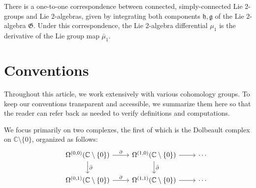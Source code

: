 \documentclass[11pt]{amsart}
\newcommand{\C}{{\mathbb C}}
\newcommand{\fg}{\mathfrak{g}}
\newcommand{\fh}{\mathfrak{h}}
\newcommand{\fG}{\mathfrak{G}}
\numberwithin{equation}{section}
\numberwithin{figure}{section}
\numberwithin{table}{section}
\theoremstyle{thm}
\numberwithin{equation}{subsection}
\theoremstyle{definition}
\theoremstyle{rem}
\begin{document}
There is a one-to-one correspondence between connected, simply-connected Lie 2-groups and Lie 2-algebras, given by integrating both components $\fh,\fg$ of the Lie 2-algebra $\fG$. Under this correspondence, the Lie 2-algebra differential $\mu_1$ is the derivative of the Lie group map $\bar\mu_1$.



\section{Conventions}

\label{sec:cohomologyconventions}


Throughout this article, we work extensively with various cohomology groups. To keep our conventions transparent and accessible, we summarize them here so that the reader can refer back as needed to verify definitions and computations.

We focus primarily on two complexes, the first of which is the Dolbeault complex on \( \mathbb{C} \setminus \{0\} \), organized as follows:
\begin{equation}
    \begin{tikzcd}
  & \Omega^{(0,0)}(\C\setminus \{0\})  \arrow[r, "\partial"] \arrow[d, "\bar \partial"] & \Omega^{(1,0)}(\C\setminus \{0\}) \arrow[r] \arrow[d, "\bar \partial"] &\cdots \\
   & \Omega^{(0,1)}(\C\setminus \{0\}) \arrow[r, "\partial"] & \Omega^{(1,1)}(\C\setminus \{0\})  \arrow[r] & \cdots
\end{tikzcd}
\end{equation}
\end{document}
